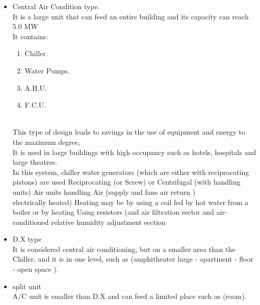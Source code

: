 \documentclass[12pt,fleqn]{book} %
\begin{document}
\begin{itemize}
    \item Central Air Condition type.
    \\ It is a large unit that can feed an entire building and its capacity can reach 5.0 MW
    \\ It contains:
    \begin{enumerate}
        \item Chiller. 
         \item Water Pumps.
          \item A.H.U.
           \item F.C.U.
                 
    \end{enumerate}
    \\This type of design leads to savings in the use of equipment and energy to the maximum degree,
\\It is used in large buildings with high occupancy such as hotels, hospitals and large theatres.
\\In this system, chiller water generators (which are either with reciprocating pistons) are used
Reciprocating (or Screw) or Centrifugal (with handling units)
Air units handling Air
(supply and fans air return )
\\electrically heated) Heating may be by using a coil fed by hot water from a boiler or by heating
Using resistors (and air filtration sector and air-conditioned relative humidity adjustment section

    \item D.X type
    \\ It is considered central air conditioning, but on a smaller area than the Chiller, and it is in one level, such as (amphitheater large - apartment - floor - open space ).
    \item split unit
    \\ A/C unit is smaller than D.X and can feed a limited place such as (room).
\end{itemize}
\end{document}
